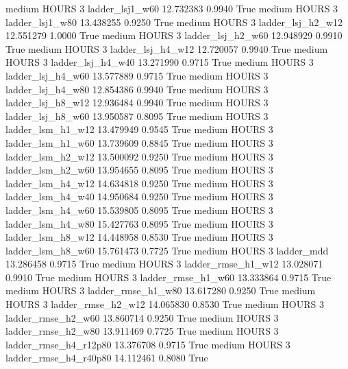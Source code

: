     medium    HOURS                 3        ladder_lsj1_w60  12.732383      0.9940    True
    medium    HOURS                 3        ladder_lsj1_w80  13.438255      0.9250    True
    medium    HOURS                 3      ladder_lsj_h2_w12  12.551279      1.0000    True
    medium    HOURS                 3      ladder_lsj_h2_w60  12.948929      0.9910    True
    medium    HOURS                 3      ladder_lsj_h4_w12  12.720057      0.9940    True
    medium    HOURS                 3      ladder_lsj_h4_w40  13.271990      0.9715    True
    medium    HOURS                 3      ladder_lsj_h4_w60  13.577889      0.9715    True
    medium    HOURS                 3      ladder_lsj_h4_w80  12.854386      0.9940    True
    medium    HOURS                 3      ladder_lsj_h8_w12  12.936484      0.9940    True
    medium    HOURS                 3      ladder_lsj_h8_w60  13.950587      0.8095    True
    medium    HOURS                 3      ladder_lsm_h1_w12  13.479949      0.9545    True
    medium    HOURS                 3      ladder_lsm_h1_w60  13.739609      0.8845    True
    medium    HOURS                 3      ladder_lsm_h2_w12  13.500092      0.9250    True
    medium    HOURS                 3      ladder_lsm_h2_w60  13.954655      0.8095    True
    medium    HOURS                 3      ladder_lsm_h4_w12  14.634818      0.9250    True
    medium    HOURS                 3      ladder_lsm_h4_w40  14.950684      0.9250    True
    medium    HOURS                 3      ladder_lsm_h4_w60  15.539805      0.8095    True
    medium    HOURS                 3      ladder_lsm_h4_w80  15.427763      0.8095    True
    medium    HOURS                 3      ladder_lsm_h8_w12  14.448958      0.8530    True
    medium    HOURS                 3      ladder_lsm_h8_w60  15.761473      0.7725    True
    medium    HOURS                 3             ladder_mdd  13.286458      0.9715    True
    medium    HOURS                 3     ladder_rmse_h1_w12  13.028071      0.9910    True
    medium    HOURS                 3     ladder_rmse_h1_w60  13.333864      0.9715    True
    medium    HOURS                 3     ladder_rmse_h1_w80  13.617280      0.9250    True
    medium    HOURS                 3     ladder_rmse_h2_w12  14.065830      0.8530    True
    medium    HOURS                 3     ladder_rmse_h2_w60  13.860714      0.9250    True
    medium    HOURS                 3     ladder_rmse_h2_w80  13.911469      0.7725    True
    medium    HOURS                 3  ladder_rmse_h4_r12p80  13.376708      0.9715    True
    medium    HOURS                 3  ladder_rmse_h4_r40p80  14.112461      0.8080    True
